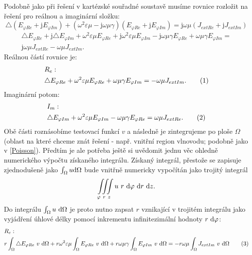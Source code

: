 \documentclass[12pt,a4paper,oneside]{article}
\numberwithin{equation}{section} %
\numberwithin{figure}{section} %
\numberwithin{table}{section} %
\newcommand{\mj}{\mathrm{j}} %
\newcommand\numberthis{\addtocounter{equation}{1}\tag{\theequation}}
\begin{document}
Podobně jako při řešení v kartézské souřadné soustavě musíme rovnice rozložit na řešení pro reálnou a imaginární složku:
\begin{equation}
\triangle (E _{\varphi Re} + \mj E _{\varphi Im}) + (\omega ^2 \varepsilon \mu - \mj \omega \mu \gamma) (E _{\varphi Re} + \mj E _{\varphi Im}) = \mj \omega \mu (J _{extRe} + \mj J _{extIm})
\end{equation}
\begin{equation}
\begin{split}
\triangle E _{\varphi Re} + \mj \triangle E _{\varphi Im} + \omega ^2 \varepsilon \mu E_ {\varphi Re} + \mj \omega ^2 \varepsilon \mu E _{\varphi Im} - \mj \omega \mu \gamma E _{\varphi Re} + \omega \mu \gamma E _{\varphi Im} =\\
\mj \omega \mu J _{extRe} - \omega \mu J _{extIm} .
\end{split}
\end{equation}
Reálnou částí rovnice je:
\begin{align*}
&R_{e}:
\\
&\triangle E_ {\varphi Re} + \omega ^2 \varepsilon \mu E_ {\varphi Re} + \omega \mu \gamma E _{\varphi Im} = - \omega \mu J _{extIm} .
\numberthis
\end{align*}
Imaginární potom:
\begin{align*}
&I_{m}:
\\
&\triangle E _{\varphi Im} + \omega ^2 \varepsilon \mu E _{\varphi Im} - \omega \mu \gamma E _{\varphi Re} = \omega \mu J _{extRe} .
\numberthis
\end{align*}
Obě části roznásobíme testovací funkcí $v$ a následně je  zintegrujeme po ploše $\Omega$ (oblast na které chceme znát řešení - např. vnitřní region vlnovodu; podobně jako v \ref{Poisson}). Předtím je ale potřeba ještě si uvědomit jednu věc ohledně numerického výpočtu získaného integrálu. Získaný integrál, přestože se zapisuje zjednodušeně jako $\int _{\Omega} u \mathrm{d} \Omega$ bude vnitřně numericky vypočítán jako trojitý integrál 
\begin{equation}
\iiint \limits_{\varphi ~ r ~ z} u ~ r ~ \mathrm{d} \varphi ~ \mathrm{d} r ~ \mathrm{d} z . 
\end{equation}
Do integrálu $\int _{\Omega} u ~ \mathrm{d} \Omega$ je proto nutno zapsat $r$ vznikající v trojitém integrálu jako vyjádření úhlové délky pomocí inkrementu infinitezimální hodnoty $r ~ \mathrm{d} \varphi$: 
\begin{align*}
&R_e:
\\
&r \int _{\Omega} \triangle E _{\varphi Re} ~ v ~ \ud \Omega + r \omega ^2 \varepsilon \mu \int _{\Omega} E _{\varphi Re} ~ v ~ \ud \Omega +  r \omega \mu \gamma \int _{\Omega} E _{\varphi Im} ~ v ~ \ud \Omega = - r \omega \mu \int _{\Omega} J _{extIm} ~ v ~ \ud \Omega
\numberthis
\end{align*}
\end{document}
